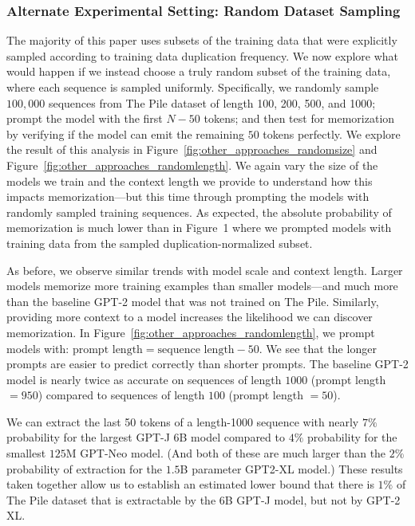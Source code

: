 \subsubsection{Alternate Experimental Setting: Random Dataset Sampling}

\label{section:other_approaches}
The majority of this paper uses subsets of the training data that were explicitly sampled according to training data duplication frequency.
%
We now explore what would happen if we instead choose a
truly random subset of the training data, where each sequence is sampled uniformly.
%
Specifically, we randomly sample $100,000$ sequences
from The Pile dataset of length 100, 200, 500, and 1000;
prompt the model with the first $N-50$ tokens; and then
test for memorization by verifying if the model can emit the remaining $50$ tokens perfectly.    
%
We explore the result of this analysis in
Figure~\ref{fig:other_approaches_randomsize} and Figure~\ref{fig:other_approaches_randomlength}.
We again vary the size of the models we train and the
context length we provide to understand how this impacts memorization---but this time through prompting the models
with randomly sampled training sequences.
%
As expected, the absolute probability of memorization is much lower than in Figure~1 where we prompted models with training data from the sampled duplication-normalized subset.

As before, we observe similar trends with model scale and context length.
Larger models memorize more training examples than smaller models---and much more than the baseline GPT-2 model
that was not trained on The Pile.
%
Similarly, providing more context to a model increases
the likelihood we can discover memorization.
%
In Figure~\ref{fig:other_approaches_randomlength}, we prompt models with: $\text{prompt length} = \text{sequence length} - 50$. We see that the longer prompts are easier to predict correctly than shorter prompts. 
The baseline GPT-2 model is nearly twice as accurate on
sequences of length $1000$ (prompt length $ = 950$) compared to sequences of length $100$ (prompt length $ = 50$).
%

We can extract the last 50 tokens of
a length-1000 sequence with nearly $7\%$ probability
for the largest GPT-J 6B model compared to $4\%$ probability 
for the smallest $125$M GPT-Neo model. (And both
of these are much larger than the $2\%$ probability 
of extraction for the $1.5$B parameter GPT2-XL model.)
%
These results taken together allow us to establish an estimated lower bound that
there is $1\%$ of The Pile dataset that is extractable
by the 6B GPT-J model, but not by GPT-2 XL.


